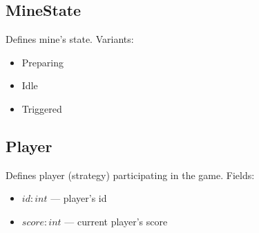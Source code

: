 \subsection{MineState}
Defines mine's state. Variants:
\begin{itemize}
    \item Preparing
    \item Idle
    \item Triggered
\end{itemize}

\subsection{Player}
Defines player (strategy) participating in the game. Fields:
\begin{itemize}
    \item $id : int$ --- player's id
    \item $score : int$ --- current player's score
\end{itemize}

